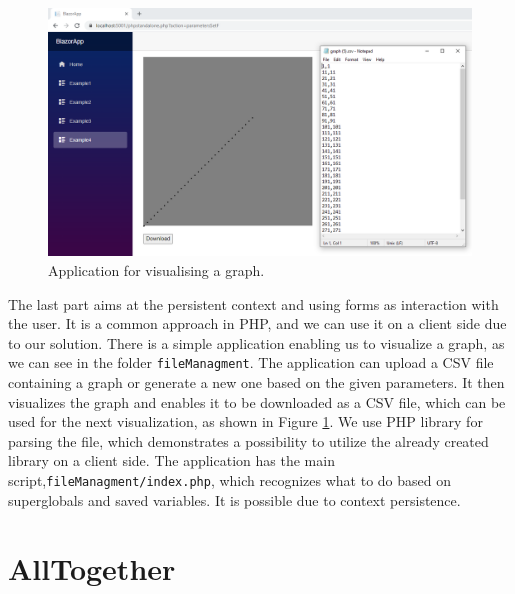 \begin{figure}[!b]\centering
\includegraphics[scale=0.4]{./img/graph}
\caption{Application for visualising a graph.}
\label{img27:graph}
\end{figure} 
\par
The last part aims at the persistent context and using forms as interaction with the user.
It is a common approach in PHP, and we can use it on a client side due to our solution.
There is a simple application enabling us to visualize a graph, as we can see in the folder \texttt{fileManagment}.
The application can upload a CSV file containing a graph or generate a new one based on the given parameters.
It then visualizes the graph and enables it to be downloaded as a CSV file, which can be used for the next visualization, as shown in Figure \ref{img27:graph}.
We use PHP library for parsing the file, which demonstrates a possibility to utilize the already created library on a client side.
The application has the main script,\texttt{fileManagment/index.php}, which recognizes what to do based on superglobals and saved variables.
It is possible due to context persistence.


 

\section{AllTogether}

